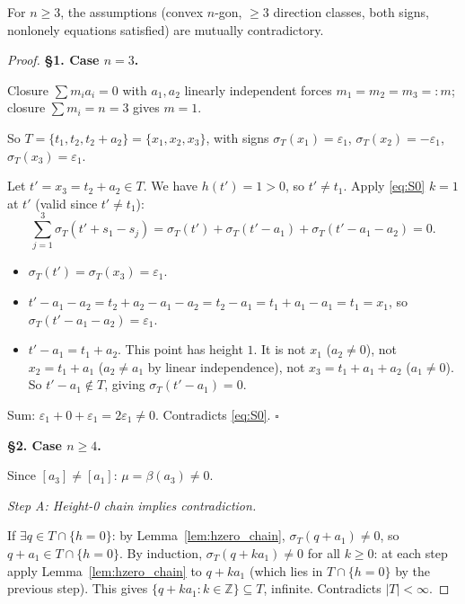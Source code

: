 \bigskip

\begin{theorem}\label{thm:main}
For $n \geq 3$, the assumptions (convex $n$-gon, $\geq 3$ direction classes, both signs,
nonlonely equations satisfied) are mutually contradictory.
\end{theorem}
\begin{proof}

\medskip
\noindent\textbf{\S 1. Case $n=3$.}

Closure $\sum m_i a_i = 0$ with $a_1, a_2$ linearly independent forces
$m_1 = m_2 = m_3 =: m$; closure $\sum m_i = n = 3$ gives $m=1$.

So $T = \{t_1, t_2, t_2+a_2\} = \{x_1, x_2, x_3\}$, with signs
$\sigma_T(x_1) = \varepsilon_1$, $\sigma_T(x_2) = -\varepsilon_1$, $\sigma_T(x_3) = \varepsilon_1$.

Let $t' = x_3 = t_2 + a_2 \in T$.  We have $h(t') = 1 > 0$, so $t' \neq t_1$.
Apply \eqref{eq:S0} $k=1$ at $t'$ (valid since $t' \neq t_1$):
\[
  \sum_{j=1}^3 \sigma_T(t' + s_1 - s_j) = \sigma_T(t') + \sigma_T(t'-a_1) + \sigma_T(t'-a_1-a_2) = 0.
\]
\begin{itemize}
\item $\sigma_T(t') = \sigma_T(x_3) = \varepsilon_1$.
\item $t'-a_1-a_2 = t_2+a_2-a_1-a_2 = t_2-a_1 = t_1+a_1-a_1 = t_1 = x_1$, so
  $\sigma_T(t'-a_1-a_2) = \varepsilon_1$.
\item $t'-a_1 = t_1+a_2$.  This point has height $1$.  It is not $x_1$ ($a_2\neq 0$),
  not $x_2 = t_1+a_1$ ($a_2 \neq a_1$ by linear independence), not $x_3 = t_1+a_1+a_2$
  ($a_1 \neq 0$).  So $t'-a_1 \notin T$, giving $\sigma_T(t'-a_1) = 0$.
\end{itemize}
Sum: $\varepsilon_1 + 0 + \varepsilon_1 = 2\varepsilon_1 \neq 0$.
Contradicts \eqref{eq:S0}.  $\square$

\medskip
\noindent\textbf{\S 2. Case $n \geq 4$.}

Since $[a_3] \neq [a_1]$: $\mu = \beta(a_3) \neq 0$.

\medskip
\noindent\emph{Step A: Height-0 chain implies contradiction.}

If $\exists q \in T \cap \{h=0\}$: by Lemma~\ref{lem:hzero_chain},
$\sigma_T(q+a_1) \neq 0$, so $q+a_1 \in T \cap \{h=0\}$.
By induction, $\sigma_T(q+ka_1) \neq 0$ for all $k \geq 0$:
at each step apply Lemma~\ref{lem:hzero_chain} to $q+ka_1$ (which lies in $T\cap\{h=0\}$
by the previous step).  This gives $\{q+ka_1 : k \in \mathbb{Z}\} \subseteq T$, infinite.
Contradicts $|T| < \infty$.


\end{proof}
